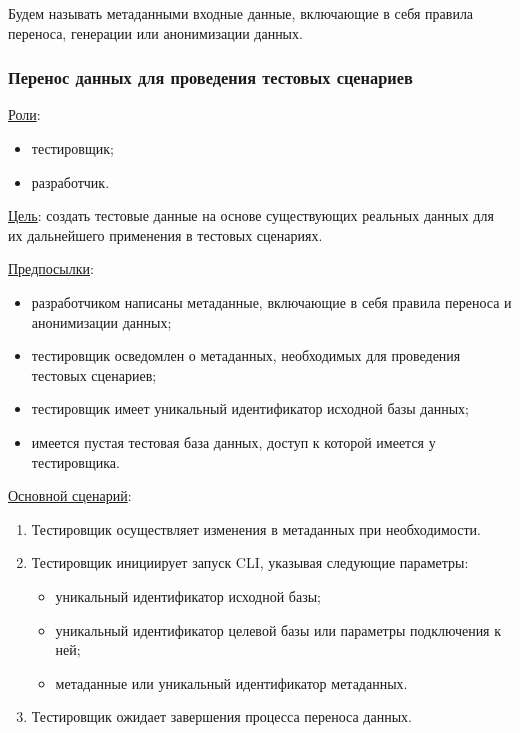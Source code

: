 Будем называть метаданными входные данные, включающие в себя правила переноса, генерации или анонимизации данных.

\subsubsection{Перенос данных для проведения тестовых сценариев}

\underline{Роли}:

\begin{itemize}
    \item тестировщик;
    \item разработчик.
\end{itemize}

\underline{Цель}: создать тестовые данные на основе существующих реальных данных для их дальнейшего применения в тестовых сценариях.

\underline{Предпосылки}:

\begin{itemize}
    \item разработчиком написаны метаданные, включающие в себя правила переноса и анонимизации данных;
    \item тестировщик осведомлен о метаданных, необходимых для проведения тестовых сценариев;
    \item тестировщик имеет уникальный идентификатор исходной базы данных;
    \item имеется пустая тестовая база данных, доступ к которой имеется у тестировщика.
\end{itemize}

\underline{Основной сценарий}:

\begin{enumerate}
    \item Тестировщик осуществляет изменения в метаданных при необходимости.
    \item Тестировщик инициирует запуск CLI, указывая следующие параметры:
    \begin{itemize}
        \item уникальный идентификатор исходной базы;
        \item уникальный идентификатор целевой базы или параметры подключения к ней;
        \item метаданные или уникальный идентификатор метаданных.
    \end{itemize}
    \item Тестировщик ожидает завершения процесса переноса данных.
\end{enumerate}

